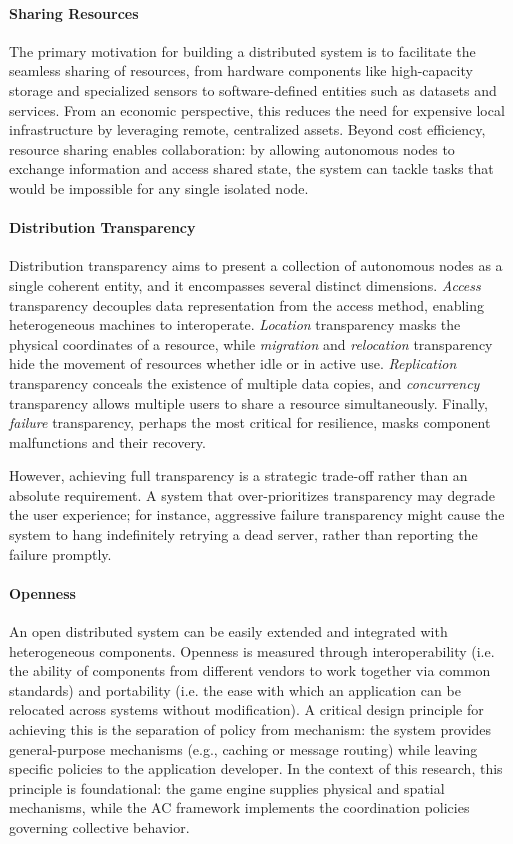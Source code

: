 \paragraph{Sharing Resources}
The primary motivation for building a distributed system is to facilitate the seamless sharing of resources, from hardware components like high-capacity storage and specialized sensors to software-defined entities such as datasets and services. From an economic perspective, this reduces the need for expensive local infrastructure by leveraging remote, centralized assets. Beyond cost efficiency, resource sharing enables collaboration: by allowing autonomous nodes to exchange information and access shared state, the system can tackle tasks that would be impossible for any single isolated node.

\paragraph{Distribution Transparency}
Distribution transparency aims to present a collection of autonomous nodes as a single coherent entity, and it encompasses several distinct dimensions. \emph{Access} transparency decouples data representation from the access method, enabling heterogeneous machines to interoperate. \emph{Location} transparency masks the physical coordinates of a resource, while \emph{migration} and \emph{relocation} transparency hide the movement of resources whether idle or in active use. \emph{Replication} transparency conceals the existence of multiple data copies, and \emph{concurrency} transparency allows multiple users to share a resource simultaneously. Finally, \emph{failure} transparency, perhaps the most critical for resilience, masks component malfunctions and their recovery.

However, achieving full transparency is a strategic trade-off rather than an absolute requirement. A system that over-prioritizes transparency may degrade the user experience; for instance, aggressive failure transparency might cause the system to hang indefinitely retrying a dead server, rather than reporting the failure promptly.

\paragraph{Openness}
An open distributed system can be easily extended and integrated with heterogeneous components. Openness is measured through interoperability (i.e. the ability of components from different vendors to work together via common standards) and portability (i.e. the ease with which an application can be relocated across systems without modification). A critical design principle for achieving this is the separation of policy from mechanism: the system provides general-purpose mechanisms (e.g., caching or message routing) while leaving specific policies to the application developer. In the context of this research, this principle is foundational: the game engine supplies physical and spatial mechanisms, while the \ac{AC} framework implements the coordination policies governing collective behavior.

